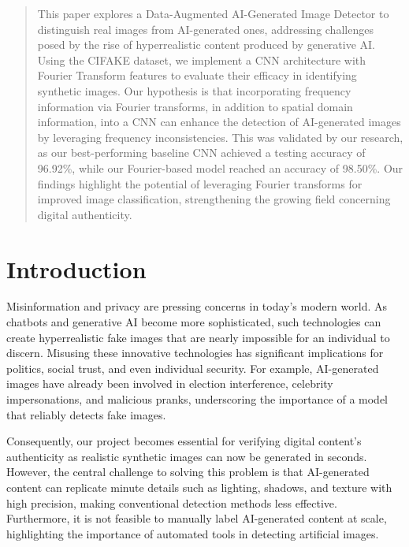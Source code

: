 \author{
Everest Yang, Tanay Subramanian, Sujith Pakala, Sami Nourji\\
    \emph{TA:} Winston Li \\
    Brown University\\
}

\maketitle

\begin{abstract}
This paper explores a Data-Augmented AI-Generated Image Detector to distinguish real images from AI-generated ones, addressing challenges posed by the rise of hyperrealistic content produced by generative AI. Using the CIFAKE dataset, we implement a CNN architecture with Fourier Transform features to evaluate their efficacy in identifying synthetic images. Our hypothesis is that incorporating frequency information via Fourier transforms, in addition to spatial domain information, into a CNN can enhance the detection of AI-generated images by leveraging frequency inconsistencies. This was validated by our research, as our best-performing baseline CNN achieved a testing accuracy of 96.92\%, while our Fourier-based model reached an accuracy of 98.50\%. Our findings highlight the potential of leveraging Fourier transforms for improved image classification, strengthening the growing field concerning digital authenticity.
\end{abstract}

\section{Introduction}

Misinformation and privacy are pressing concerns in today’s modern world. As chatbots and generative AI become more sophisticated, such technologies can create hyperrealistic fake images that are nearly impossible for an individual to discern. Misusing these innovative technologies has significant implications for politics, social trust, and even individual security. For example, AI-generated images have already been involved in election interference, celebrity impersonations, and malicious pranks, underscoring the importance of a model that reliably detects fake images.

Consequently, our project becomes essential for verifying digital content's authenticity as realistic synthetic images can now be generated in seconds. However, the central challenge to solving this problem is that AI-generated content can replicate minute details such as lighting, shadows, and texture with high precision, making conventional detection methods less effective. Furthermore, it is not feasible to manually label AI-generated content at scale, highlighting the importance of automated tools in detecting artificial images.

